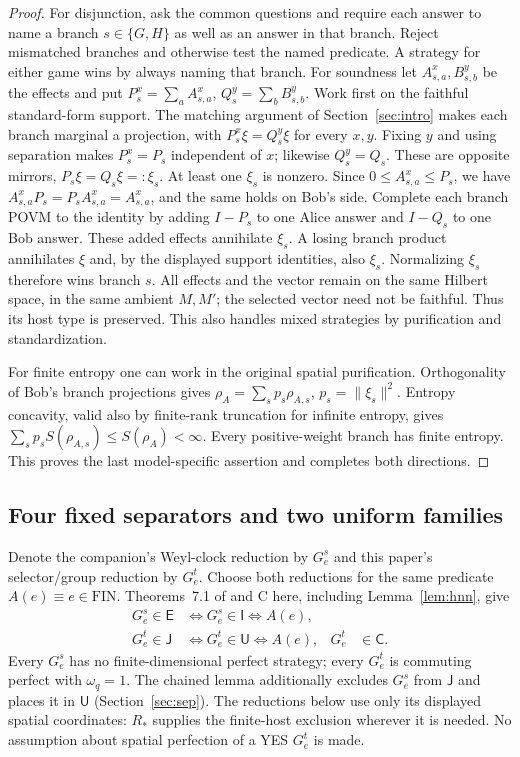 \begin{proof}
For disjunction, ask the common questions and require each answer to
name a branch $s\in\{G,H\}$ as well as an answer in that branch.
Reject mismatched branches and otherwise test the named predicate.
A strategy for either game wins by always naming that branch.
For soundness let $A_{s,a}^x,B_{s,b}^y$ be the effects and put
$P_s^x=\sum_aA_{s,a}^x$, $Q_s^y=\sum_bB_{s,b}^y$.
Work first on the faithful standard-form support. The matching
argument of Section~\ref{sec:intro} makes each branch marginal a
projection, with
$P_s^x\xi=Q_s^y\xi$ for every $x,y$. Fixing $y$ and using separation
makes $P_s^x=P_s$ independent of $x$; likewise $Q_s^y=Q_s$.
These are opposite mirrors, $P_s\xi=Q_s\xi=:\xi_s$.
At least one $\xi_s$ is nonzero. Since $0\leq A_{s,a}^x\leq P_s$,
we have $A_{s,a}^xP_s=P_sA_{s,a}^x=A_{s,a}^x$, and the same holds
on Bob's side. Complete each branch POVM to the identity by adding
$I-P_s$ to one Alice answer and $I-Q_s$ to one Bob answer.
These added effects annihilate $\xi_s$. A losing branch product
annihilates $\xi$ and, by the displayed support identities, also
$\xi_s$. Normalizing $\xi_s$ therefore wins branch $s$.
All effects and the vector remain on the same Hilbert space, in the
same ambient $M,M'$; the selected vector need not be faithful.
Thus its host type is preserved. This also handles mixed strategies
by purification and standardization.

For finite entropy one can work in the original spatial purification.
Orthogonality of Bob's branch projections gives
$\rho_A=\sum_s p_s\rho_{A,s}$, $p_s=\|\xi_s\|^2$.
Entropy concavity, valid also by finite-rank truncation for infinite
entropy, gives $\sum_s p_sS(\rho_{A,s})\leq S(\rho_A)<\infty$.
Every positive-weight branch has finite entropy. This proves the last
model-specific assertion and completes both directions.
\end{proof}

\subsection{Four fixed separators and two uniform families}
Denote the companion's Weyl-clock reduction by $G^s_e$ and this
paper's selector/group reduction by $G^t_e$. Choose both reductions
for the same predicate $A(e)\equiv e\in\mathrm{FIN}$. Theorems~7.1
of \cite{Spatial} and C here, including Lemma~\ref{lem:hnn}, give
\begin{align}
 G^s_e\in\mathsf E&\iff G^s_e\in\mathsf I\iff A(e),
 &&\label{eq:sharedE}\\
 G^t_e\in\mathsf J&\iff G^t_e\in\mathsf U\iff A(e),
 &G^t_e&\in\mathsf C.\label{eq:sharedJ}
\end{align}
Every $G^s_e$ has no finite-dimensional perfect strategy; every
$G^t_e$ is commuting perfect with $\omega_q=1$.
The chained lemma additionally excludes $G^s_e$ from $\mathsf J$
and places it in $\mathsf U$ (Section~\ref{sec:sep}). The reductions
below use only its displayed spatial coordinates: $R_*$ supplies
the finite-host exclusion wherever it is needed.
No assumption about spatial perfection of a YES $G^t_e$ is made.

